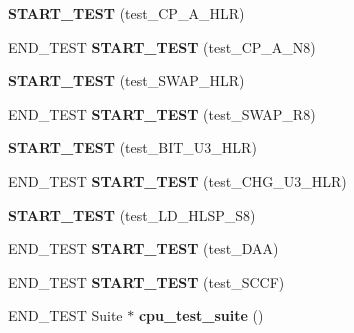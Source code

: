 \begin{DoxyCompactItemize}
\item 
\mbox{\label{unit-test-cpu-dispatch_8c_abe46add04ac78a55e982128d69d5886a}} 
{\bfseries S\+T\+A\+R\+T\+\_\+\+T\+E\+ST} (test\+\_\+\+C\+P\+\_\+\+A\+\_\+\+H\+LR)
\item 
\mbox{\label{unit-test-cpu-dispatch_8c_a5227d75aea79f7fa1d18a8451abe2fb9}} 
E\+N\+D\+\_\+\+T\+E\+ST {\bfseries S\+T\+A\+R\+T\+\_\+\+T\+E\+ST} (test\+\_\+\+C\+P\+\_\+\+A\+\_\+\+N8)
\item 
\mbox{\label{unit-test-cpu-dispatch_8c_a1519c0b6f7a19fcbd50f7e92dfc9454a}} 
{\bfseries S\+T\+A\+R\+T\+\_\+\+T\+E\+ST} (test\+\_\+\+S\+W\+A\+P\+\_\+\+H\+LR)
\item 
\mbox{\label{unit-test-cpu-dispatch_8c_a73444a1d0b7e2f5ac0967ad58f68ed67}} 
E\+N\+D\+\_\+\+T\+E\+ST {\bfseries S\+T\+A\+R\+T\+\_\+\+T\+E\+ST} (test\+\_\+\+S\+W\+A\+P\+\_\+\+R8)
\item 
\mbox{\label{unit-test-cpu-dispatch_8c_adf34a8c545e19ddac667398f09735779}} 
{\bfseries S\+T\+A\+R\+T\+\_\+\+T\+E\+ST} (test\+\_\+\+B\+I\+T\+\_\+\+U3\+\_\+\+H\+LR)
\item 
\mbox{\label{unit-test-cpu-dispatch_8c_abb4b6bd3e99d4ac0ff0caa6273aac844}} 
E\+N\+D\+\_\+\+T\+E\+ST {\bfseries S\+T\+A\+R\+T\+\_\+\+T\+E\+ST} (test\+\_\+\+C\+H\+G\+\_\+\+U3\+\_\+\+H\+LR)
\item 
\mbox{\label{unit-test-cpu-dispatch_8c_af4030280d46f9db452de29dbf42f649f}} 
{\bfseries S\+T\+A\+R\+T\+\_\+\+T\+E\+ST} (test\+\_\+\+L\+D\+\_\+\+H\+L\+S\+P\+\_\+\+S8)
\item 
\mbox{\label{unit-test-cpu-dispatch_8c_a09ee34026428c1bf30f2a5c6d3c347d9}} 
E\+N\+D\+\_\+\+T\+E\+ST {\bfseries S\+T\+A\+R\+T\+\_\+\+T\+E\+ST} (test\+\_\+\+D\+AA)
\item 
\mbox{\label{unit-test-cpu-dispatch_8c_a06abc329ad18f0a6ad792ce2e1aca8c2}} 
E\+N\+D\+\_\+\+T\+E\+ST {\bfseries S\+T\+A\+R\+T\+\_\+\+T\+E\+ST} (test\+\_\+\+S\+C\+CF)
\item 
\mbox{\label{unit-test-cpu-dispatch_8c_a4c9cbb657fbc29519addb71dcc4928b8}} 
E\+N\+D\+\_\+\+T\+E\+ST Suite $\ast$ {\bfseries cpu\+\_\+test\+\_\+suite} ()
\end{DoxyCompactItemize}


